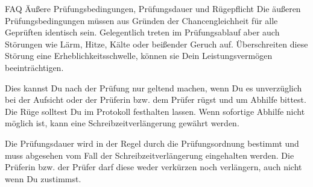 \begin{artikel}{FAQ Äußere Prüfungsbedingungen, Prüfungsdauer und Rügepflicht}
Die äußeren Prüfungsbedingungen müssen aus Gründen der Chancengleichheit für alle Geprüften identisch sein. Gelegentlich treten im Prüfungsablauf aber auch Störungen wie Lärm, Hitze, Kälte oder beißender Geruch auf. Überschreiten diese Störung eine Erheblichkeitsschwelle, können sie Dein Leistungsvermögen beeinträchtigen.

Dies kannst Du nach der Prüfung nur geltend machen, wenn Du es unverzüglich bei der Aufsicht oder der Prüferin bzw. dem Prüfer rügst und um Abhilfe bittest. Die Rüge solltest Du im Protokoll festhalten lassen. Wenn sofortige Abhilfe nicht möglich ist, kann eine Schreibzeitverlängerung gewährt werden.

Die Prüfungsdauer wird in der Regel durch die Prüfungsordnung bestimmt und muss abgesehen vom Fall der Schreibzeitverlängerung eingehalten werden. Die Prüferin bzw. der Prüfer darf diese weder verkürzen noch verlängern, auch nicht wenn Du zustimmst.
\end{artikel}
